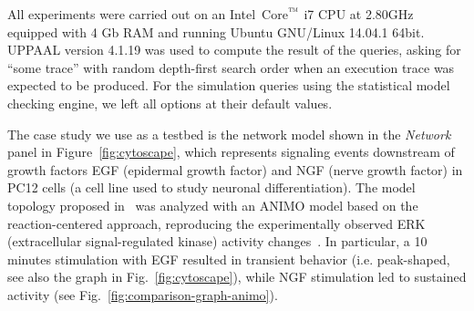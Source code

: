 \documentclass{llncs}
\begin{document}
All experiments were carried out on an Intel\circledR\ Core$^{\mbox{\scriptsize\texttrademark}}$ i7 CPU at 2.80GHz equipped with 4 Gb RAM
and running Ubuntu GNU/Linux 14.04.1 64bit.
UPPAAL version 4.1.19 was used to compute the result of the queries, asking for ``some trace'' with random depth-first search order
when an execution trace was expected to be produced. For the simulation queries using the statistical model checking engine, we left
all options at their default values.

The case study we use as a testbed is the network model shown in the \emph{Network} panel in Figure~\ref{fig:cytoscape},
which represents signaling events downstream of growth factors EGF (epidermal growth factor)
and NGF (nerve growth factor) in PC12 cells (a cell line used to study neuronal differentiation).
The model topology proposed in~\cite{egf-ngf} was analyzed
with an ANIMO model based on the reaction-centered approach, reproducing the experimentally 
observed ERK (extracellular signal-regulated kinase) activity changes~\cite{animo-ieee}.
In particular, a 10 minutes stimulation with EGF resulted in transient behavior (i.e. peak-shaped,
see also the graph in Fig.~\ref{fig:cytoscape}), while NGF stimulation led to sustained activity (see Fig.~\ref{fig:comparison-graph-animo}).
\end{document}
